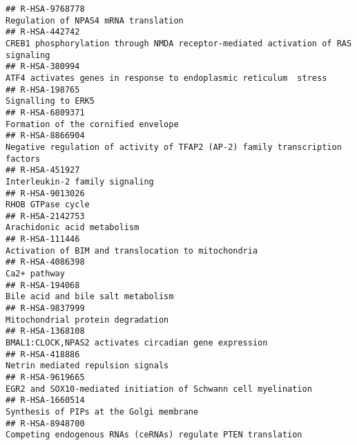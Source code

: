 \documentclass[
]{article}
\begin{document}
\begin{verbatim}
## R-HSA-9768778                                                                                                 Regulation of NPAS4 mRNA translation
## R-HSA-442742                                                      CREB1 phosphorylation through NMDA receptor-mediated activation of RAS signaling
## R-HSA-380994                                                                     ATF4 activates genes in response to endoplasmic reticulum  stress
## R-HSA-198765                                                                                                                    Signalling to ERK5
## R-HSA-6809371                                                                                                  Formation of the cornified envelope
## R-HSA-8866904                                                         Negative regulation of activity of TFAP2 (AP-2) family transcription factors
## R-HSA-451927                                                                                                        Interleukin-2 family signaling
## R-HSA-9013026                                                                                                                    RHOB GTPase cycle
## R-HSA-2142753                                                                                                          Arachidonic acid metabolism
## R-HSA-111446                                                                                  Activation of BIM and translocation to mitochondria 
## R-HSA-4086398                                                                                                                         Ca2+ pathway
## R-HSA-194068                                                                                                    Bile acid and bile salt metabolism
## R-HSA-9837999                                                                                                    Mitochondrial protein degradation
## R-HSA-1368108                                                                                BMAL1:CLOCK,NPAS2 activates circadian gene expression
## R-HSA-418886                                                                                                     Netrin mediated repulsion signals
## R-HSA-9619665                                                                       EGR2 and SOX10-mediated initiation of Schwann cell myelination
## R-HSA-1660514                                                                                              Synthesis of PIPs at the Golgi membrane
## R-HSA-8948700                                                                         Competing endogenous RNAs (ceRNAs) regulate PTEN translation

\end{verbatim}
\end{document}
